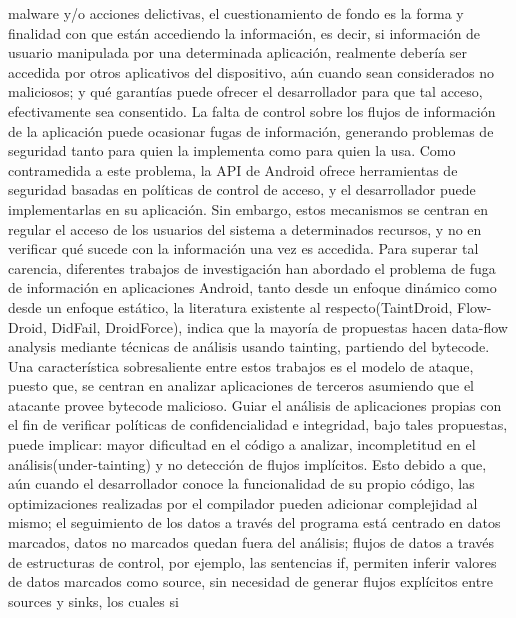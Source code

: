 malware y/o acciones delictivas, el cuestionamiento de fondo es la forma y
finalidad con que están accediendo la información, es decir, si información
de usuario manipulada por una determinada aplicación, realmente debería ser
accedida por otros aplicativos del dispositivo, aún cuando sean considerados no
maliciosos; y qué garantías puede ofrecer el desarrollador para que tal acceso,
efectivamente sea consentido.\newline 
La falta de control sobre los flujos de información de la aplicación puede
ocasionar fugas de información, generando problemas de seguridad tanto para
quien la implementa como para quien la usa.\newline
Como contramedida a este problema, la API de Android ofrece herramientas de
seguridad basadas en políticas de control de acceso, y el desarrollador puede
implementarlas en su aplicación. Sin embargo, estos mecanismos se centran en
regular el acceso de los usuarios del sistema a determinados recursos, y no en
verificar qué sucede con la información una vez es accedida.\newline 
Para superar tal carencia, diferentes trabajos de investigación han abordado el
problema de fuga de información en aplicaciones Android, tanto desde un enfoque
dinámico como desde un enfoque estático, la literatura existente al
respecto(TaintDroid\cite{TaintDroid}, Flow-Droid\cite{FlowDroid-Thesis},
DidFail\cite{DidFail}, DroidForce\cite{DroidForce}), indica que la mayoría de
propuestas hacen data-flow analysis mediante técnicas de análisis usando
tainting, partiendo del bytecode. Una característica sobresaliente entre estos
trabajos es el modelo de ataque, puesto que, se centran en analizar aplicaciones
de terceros asumiendo que el atacante provee bytecode malicioso. Guiar el
análisis de aplicaciones propias con el fin de verificar políticas de
confidencialidad e integridad, bajo tales propuestas, puede implicar: mayor
dificultad en el código a analizar, incompletitud en el análisis(under-tainting)
y no detección de flujos implícitos. Esto debido a que, aún cuando el
desarrollador conoce la funcionalidad de su propio código, las optimizaciones
realizadas por el compilador pueden adicionar complejidad al
mismo\cite[pag.~43]{SecureProgramming}; el seguimiento de los datos a través del
programa está centrado en datos marcados, datos no marcados quedan fuera del
análisis;   flujos de datos a través de estructuras de control, por ejemplo, las
sentencias if, permiten inferir valores de datos marcados como source, sin
necesidad de generar flujos explícitos entre sources y sinks, los cuales si
